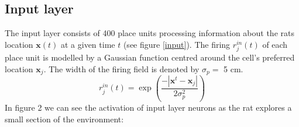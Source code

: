\documentclass[a4paper, 12pt]{article}
\begin{document}
\subsection{Input layer}
The input layer consists of 400 place units processing information about the rats location $\boldsymbol{x}(t)$ at a given time $t$ (see figure \ref{input}). The firing $r_j^{in}(t)$ of each place unit is modelled by a Gaussian function centred around the cell's preferred location $\boldsymbol{x}_j$. The width of the firing field is denoted by $\sigma_p=$ 5 cm. 
	\begin{equation}
	r_j^{in}(t)=\exp\left(\frac{-|\boldsymbol{x}^t-\boldsymbol{x}_j|}{2\sigma_p^2}\right)
	\end{equation}
In figure 2 we can see the activation of input layer neurons as the rat explores a small section of the environment:  
\end{document}
